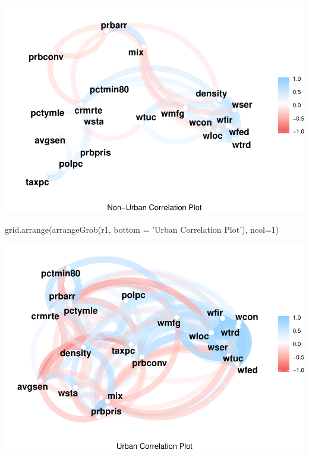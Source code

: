 \documentclass[]{article}
\newenvironment{Shaded}{}{}
\newcommand{\DataTypeTok}[1]{#1}
\newcommand{\DecValTok}[1]{#1}
\newcommand{\KeywordTok}[1]{\textcolor[rgb]{0.00,0.00,1.00}{#1}}
\newcommand{\NormalTok}[1]{#1}
\newcommand{\StringTok}[1]{\textcolor[rgb]{0.00,0.50,0.50}{#1}}
\begin{document}
\includegraphics{Bagnard_Gaustad_Hartman_Leung_Lab_3_files/figure-latex/unnamed-chunk-91-4.pdf}

\begin{Shaded}
\begin{Highlighting}[]
\KeywordTok{grid.arrange}\NormalTok{(}\KeywordTok{arrangeGrob}\NormalTok{(r1, }\DataTypeTok{bottom =} \StringTok{'Urban Correlation Plot'}\NormalTok{), }\DataTypeTok{ncol=}\DecValTok{1}\NormalTok{)}
\end{Highlighting}
\end{Shaded}

\includegraphics{Bagnard_Gaustad_Hartman_Leung_Lab_3_files/figure-latex/unnamed-chunk-91-5.pdf}
\end{document}
